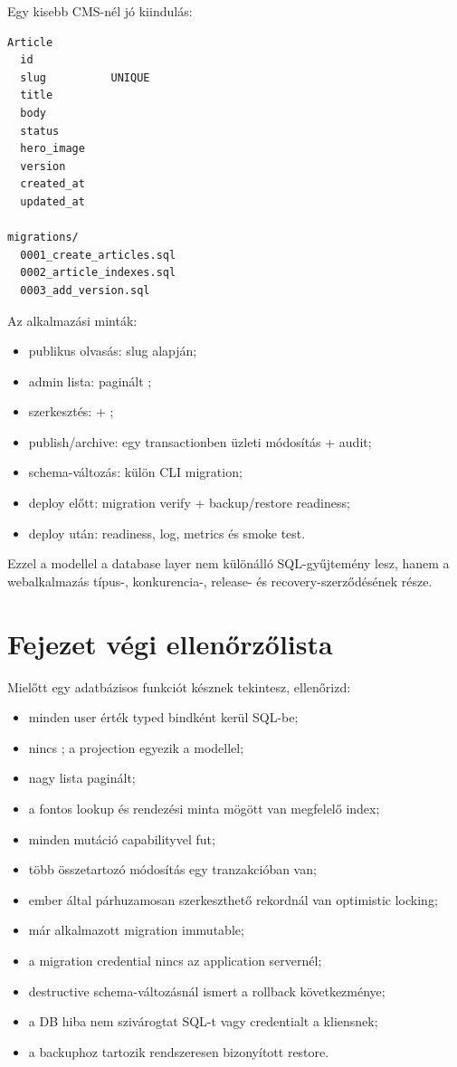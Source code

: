 Egy kisebb CMS-nél jó kiindulás:

\begin{lstlisting}
Article
  id
  slug          UNIQUE
  title
  body
  status
  hero_image
  version
  created_at
  updated_at

migrations/
  0001_create_articles.sql
  0002_article_indexes.sql
  0003_add_version.sql
\end{lstlisting}

Az alkalmazási minták:

\begin{itemize}
\item publikus olvasás:  slug alapján;
\item admin lista: paginált ;
\item szerkesztés:  + ;
\item publish/archive: egy transactionben üzleti módosítás + audit;
\item schema-változás: külön CLI migration;
\item deploy előtt: migration verify + backup/restore readiness;
\item deploy után: readiness, log, metrics és smoke test.
\end{itemize}

Ezzel a modellel a database layer nem különálló SQL-gyűjtemény lesz, hanem a webalkalmazás típus-, konkurencia-, release- és recovery-szerződésének része.

\section{Fejezet végi ellenőrzőlista}

Mielőtt egy adatbázisos funkciót késznek tekintesz, ellenőrizd:

\begin{itemize}
\item minden user érték typed bindként kerül SQL-be;
\item nincs ; a projection egyezik a modellel;
\item nagy lista paginált;
\item a fontos lookup és rendezési minta mögött van megfelelő index;
\item minden mutáció  capabilityvel fut;
\item több összetartozó módosítás egy tranzakcióban van;
\item ember által párhuzamosan szerkeszthető rekordnál van optimistic locking;
\item már alkalmazott migration immutable;
\item a migration credential nincs az application servernél;
\item destructive schema-változásnál ismert a rollback következménye;
\item a DB hiba nem szivárogtat SQL-t vagy credentialt a kliensnek;
\item a backuphoz tartozik rendszeresen bizonyított restore.
\end{itemize}

